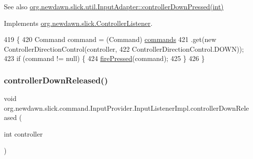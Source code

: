 \begin{DoxySeeAlso}{See also}
\mbox{\hyperlink{classorg_1_1newdawn_1_1slick_1_1util_1_1_input_adapter_af48b82447762dff2bc4b171d51468f1a}{org.\+newdawn.\+slick.\+util.\+Input\+Adapter\+::controller\+Down\+Pressed(int)}} 
\end{DoxySeeAlso}


Implements \mbox{\hyperlink{interfaceorg_1_1newdawn_1_1slick_1_1_controller_listener_a9c619e7cb29b3c8b68bc24f9a4e238d7}{org.\+newdawn.\+slick.\+Controller\+Listener}}.


\begin{DoxyCode}
419                                                           \{
420             Command command = (Command) \mbox{\hyperlink{classorg_1_1newdawn_1_1slick_1_1command_1_1_input_provider_ab2bd0c08506a59bc7457d7a87cf873d2}{commands}}
421                     .\textcolor{keyword}{get}(\textcolor{keyword}{new} ControllerDirectionControl(controller,
422                             ControllerDirectionControl.DOWN));
423             \textcolor{keywordflow}{if} (command != null) \{
424                 \mbox{\hyperlink{classorg_1_1newdawn_1_1slick_1_1command_1_1_input_provider_a82cd36086b5780ccce446717e8075e96}{firePressed}}(command);
425             \}
426         \}
\end{DoxyCode}
\mbox{\label{classorg_1_1newdawn_1_1slick_1_1command_1_1_input_provider_1_1_input_listener_impl_a088db9874120ee50128d286f0c2f4d87}} 
\subsubsection{\texorpdfstring{controller\+Down\+Released()}{controllerDownReleased()}}
{\footnotesize\ttfamily void org.\+newdawn.\+slick.\+command.\+Input\+Provider.\+Input\+Listener\+Impl.\+controller\+Down\+Released (\begin{DoxyParamCaption}\item[{int}]{controller }\end{DoxyParamCaption})\hspace{0.3cm}{\ttfamily [inline]}}


